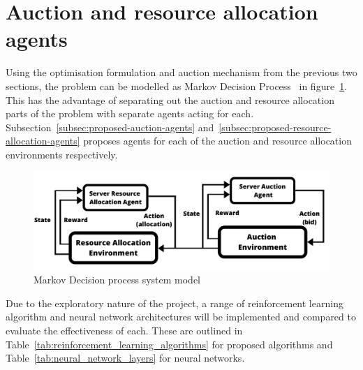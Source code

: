 \section{Auction and resource allocation agents}\label{sec:proposed-agents}
Using the optimisation formulation and auction mechanism from the previous two sections, the problem can be modelled as
Markov Decision Process~\citep{Bel} in figure~\ref{fig:mdp_system_model}. This has the advantage of separating out the
auction and resource allocation parts of the problem with separate agents acting for each.
Subsection~\ref{subsec:proposed-auction-agents} and~\ref{subsec:proposed-resource-allocation-agents} proposes agents
for each of the auction and resource allocation environments respectively.

\begin{figure}[h]
    \centering
    \includegraphics[width=14cm]{figures/2_solution_figs/flexible_resource_allocation_env.pdf}
    \caption{Markov Decision process system model}
    \label{fig:mdp_system_model}
\end{figure}


Due to the exploratory nature of the project, a range of reinforcement learning algorithm and neural network
architectures will be implemented and compared to evaluate the effectiveness of each. These are outlined in
Table~\ref{tab:reinforcement_learning_algorithms} for proposed algorithms and Table~\ref{tab:neural_network_layers} for
neural networks.

